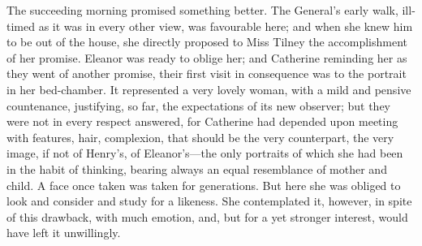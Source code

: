  The succeeding morning promised something better. The General's early walk, ill-timed as it was in every other view, was favourable here; and when she knew him to be out of the house, she directly proposed to Miss Tilney the accomplishment of her promise. Eleanor was ready to oblige her; and Catherine reminding her as they went of another promise, their first visit in consequence was to the portrait in her bed-chamber. It represented a very lovely woman, with a mild and pensive countenance, justifying, so far, the expectations of its new observer; but they were not in every respect answered, for Catherine had depended upon meeting with features, hair, complexion, that should be the very counterpart, the very image, if not of Henry's, of Eleanor's—the only portraits of which she had been in the habit of thinking, bearing always an equal resemblance of mother and child. A face once taken was taken for generations. But here she was obliged to look and consider and study for a likeness. She contemplated it, however, in spite of this drawback, with much emotion, and, but for a yet stronger interest, would have left it unwillingly. 

